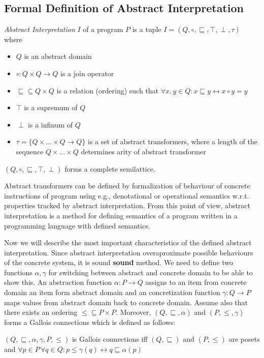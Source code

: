 \documentclass[a4paper, 12pt]{article}
\newcommand{\aord}[0]{\sqsubseteq}
\newcommand{\cord}[0]{\leq}
\newcommand{\adom}[0]{Q}
\newcommand{\aitem}[0]{q}
\newcommand{\asup}[0]{\top}
\newcommand{\ainf}[0]{\perp}
\newcommand{\cdom}[0]{P}
\newcommand{\citem}[0]{p}
\newcommand{\atrans}[0]{\tau}
\newcommand{\ajoin}[0]{\circ}
\newcommand{\afun}[0]{\alpha}
\newcommand{\cfun}[0]{\gamma}
\begin{document}
\subsection{Formal Definition of Abstract Interpretation}
\emph{Abstract Interpretation} $I$ of a program $P$ is a tuple
$I=(\adom, \ajoin, \aord, \asup, \ainf, \atrans)$ where
\begin{itemize}
	\item $\adom$ is an abstract domain
	\item $\ajoin: \adom \times \adom \rightarrow \adom$ is a join operator
	\item $\aord \subseteq \adom \times \adom$ is a relation (ordering) such that $\forall x,y \in \adom: x \aord y \leftrightarrow x \ajoin y = y$
	\item $\asup$ is a supremum of $\adom$
	\item $\ainf$ is a infinum of $\adom$
	\item $\atrans = \{\adom \times \ldots \times \adom \rightarrow \adom\}$ is a set of abstract transformers, where a length of
		the sequence $\adom \times \ldots \times \adom$ determines arity of abstract transformer
\end{itemize}


$(\adom, \ajoin, \aord, \top, \perp)$ forms a complete semilattice.

Abstract transformers can be defined by formalization of behaviour of concrete instructions
of program using e.g., denotational or operational semantics w.r.t. properties tracked
by abstract interpretation.
From this point of view, abstract interpretation is a method for defining semantics
of a program written in a programming language with defined semantics.

Now we will describe the most important characteristics of the defined abstract interpretation.
Since abstract interpretation overaproximate possible behaviours of
the concrete system, it is sound \textbf{sound} method.
We need to define two functions $\afun, \cfun$ for switching between abstract
and concrete domain to be able to show this.
An abstraction function $\afun: \cdom \rightarrow \adom$ assigns to an item from
concrete domain an item form abstract domain and an concretization function
$\cfun: \adom \rightarrow \cdom$ maps values from abstract domain back to concrete domain.
Assume also that there exists an ordering $\cord \subseteq \cdom \times \cdom$.
Moreover, $(\adom, \aord, \afun)$ and $(\cdom, \cord, \cfun)$ forms
a Gallois connections which is defined as follows:
\begin{center}
	$(\adom, \aord, \afun, \cfun, \cdom, \cord)$ is Gallois connections iff
	$(\adom, \aord)$ and $(\cdom, \cord)$ are posets and
	$\forall \citem \in \cdom \, \forall \aitem \in \adom: \citem \cord \cfun(\aitem)
	\leftrightarrow \aitem \aord \afun(\citem)$
\end{center}
\end{document}
